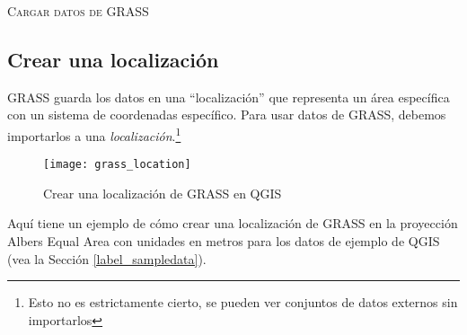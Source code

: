 \begin{Tip}\caption{\textsc{Cargar datos de GRASS}}
\end{Tip} 

\subsection{Crear una localización}\label{sec:create_loc}

GRASS guarda los datos en una ``localización'' que representa un área específica con un sistema de coordenadas específico. Para usar datos de GRASS, debemos importarlos a una \textsl{localización}.\footnote{Esto no es estrictamente cierto, se pueden ver conjuntos de datos externos sin importarlos}

\begin{figure}[ht]
   \begin{center}
   \caption{Crear una localización de GRASS en QGIS}\label{fig:grass_location}\smallskip
   \texttt{[image: grass\_location]}
\end{center}  
\end{figure}

Aquí tiene un ejemplo de cómo crear una localización de GRASS en la proyección Albers Equal Area con unidades en metros para los datos de ejemplo de QGIS (vea la Sección \ref{label_sampledata}). 


